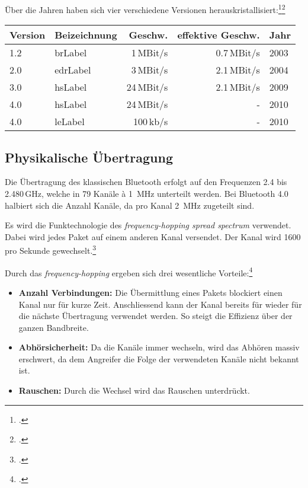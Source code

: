 Über die Jahren haben sich vier verschiedene Versionen herauskristallisiert:\footcite{Bluetooth_low_energy_Wikipedia_2015-04-17}\footcite{Our_History_Bluetooth_Technology_Website_2015-04-17}
\begin{table}[H]
\small\sffamily\renewcommand{\arraystretch}{1.4}
\begin{tabular}{llrrl}
\toprule
	Version & Beizeichnung & Geschw. & effektive Geschw.  & Jahr\\
\midrule
	1.2 & \gls{brLabel} & 1\,MBit/s & 0.7\,MBit/s & 2003 \\
	2.0 & \gls{edrLabel} & 3\,MBit/s & 2.1\,MBit/s & 2004 \\
	3.0 & \gls{hsLabel} & 24\,MBit/s & 2.1\,MBit/s & 2009\\
	4.0 & \gls{hsLabel} & 24\,MBit/s & -  & 2010 \\
	4.0 & \gls{leLabel} & 100\,kb/s &  - & 2010 \\
\bottomrule
\end{tabular}
\end{table}



\subsection{Physikalische Übertragung}
Die Übertragung des klassischen Bluetooth erfolgt auf den Frequenzen 2.4 bis 2.480\,GHz, welche in 79 Kanäle à 1\, MHz unterteilt werden.
Bei Bluetooth 4.0 halbiert sich die Anzahl Kanäle, da pro Kanal 2\, MHz zugeteilt sind.

Es wird die Funktechnologie des \textit{frequency-hopping spread spectrum} verwendet.
Dabei wird jedes Paket auf einem anderen Kanal versendet.
Der Kanal wird 1600 pro Sekunde gewechselt.\footcite{Bluetooth_Wikipedia_2015-04-17}

Durch das \textit{frequency-hopping} ergeben sich drei wesentliche Vorteile:\footcite{Frequency-hopping_spread_spectrum_-_Wikipedia_2015-04-17}
\begin{itemize}
	\item \textbf{Anzahl Verbindungen:} Die Übermittlung eines Pakets blockiert einen Kanal nur für kurze Zeit. Anschliessend kann der Kanal bereits für wieder für die nächste Übertragung verwendet werden. So steigt die Effizienz über der ganzen Bandbreite.
	\item \textbf{Abhörsicherheit:} Da die Kanäle immer wechseln, wird das Abhören massiv erschwert, da dem Angreifer die Folge der verwendeten Kanäle nicht bekannt ist.
	\item \textbf{Rauschen:} Durch die Wechsel wird das Rauschen unterdrückt.
\end{itemize}


